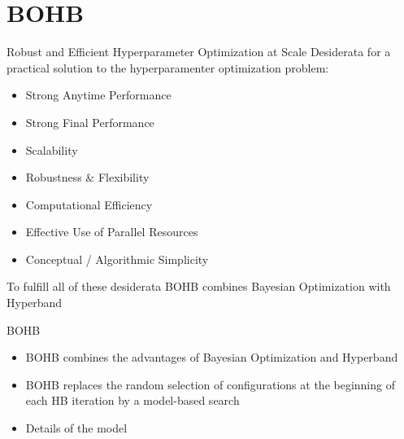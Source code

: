 \section{BOHB}
\begin{frame}[c]{Robust and Efficient Hyperparameter Optimization at Scale}
Desiderata for a practical solution to the hyperparamenter optimization problem:
\begin{itemize}
    \item Strong Anytime Performance
    \item Strong Final Performance
    \pause
    \item Scalability
    \item Robustness $\&$ Flexibility
    \pause
    \item Computational Efficiency
    \item Effective Use of Parallel Resources
    \pause
    \item Conceptual / Algorithmic Simplicity
    \pause
\end{itemize}
\bigskip
To fulfill all of these desiderata BOHB combines Bayesian Optimization with Hyperband

\end{frame}
\begin{frame}[c]{BOHB}
\begin{itemize}
    \item BOHB combines the advantages of Bayesian Optimization and Hyperband
\pause
\bigskip
    \item BOHB replaces the random selection of configurations at the beginning of each HB iteration by a model-based search
\pause
\bigskip
    \item Details of the model
\end{itemize}

\end{frame}

